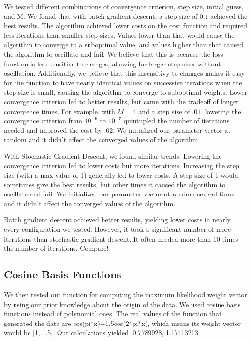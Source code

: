 \documentclass[a4paper,twoside]{article}
\begin{document}
We tested different combinations of convergence criterion, step size, initial guess, and M. We found that with batch gradient descent, a step size of $0.1$ achieved the best results. The algorithm achieved lower costs on the cost function and required less iterations than smaller step sizes. Values lower than that would cause the algorithm to converge to a suboptimal value, and values higher than that caused the algorithm to oscillate and fail. We believe that this is because the loss function is less sensitive to changes, allowing for larger step sizes without oscillation. Additionally, we believe that this insensitivy to changes makes it easy for the function to have nearly identical values on successive iterations when the step size is small, causing the algorithm to converge to suboptimal weights. Lower convergence criterion led to better results, but came with the tradeoff of longer convergence times. For example, with $M=4$ and a step size of $.01$, lowering the convergence criterion from $10^{-6}$ to $10^{-7}$ quintupled the number of iterations needed and improved the cost by $.02$. We initialized our parameter vector at random and it didn't affect the converged values of the algorithm. 

With Stochastic Gradient Descent, we found similar trends. Lowering the convergence criterion led to lower costs but more iterations. Increasing the step size (with a max value of 1) generally led to lower costs. A step size of 1 would sometimes give the best results, but other times it caused the algorithm to oscillate and fail. We initialized our parameter vector at random several times and it didn't affect the converged values of the algorithm. 

Batch gradient descent achieved better results, yielding lower costs in nearly every configuration we tested. However, it took a significant number of more iterations than stochastic gradient descent. It often needed more than 10 times the number of iterations. 
Compare!

\subsection{Cosine Basis Functions}

We then tested our function for computing the maximum likelihood weight vector by using our prior knowledge about the origin of the data. We used cosine basis functions instead of polynomial ones. The real values of the function that generated the data are cos(pi*x)+1.5cos(2*pi*x), which means its weight vector would be [1, 1.5]. Our calculations yielded [0.7789928, 1.17413213]. 
\end{document}
